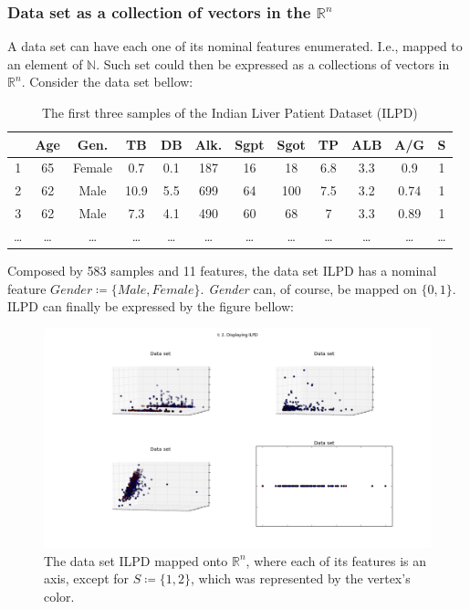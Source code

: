 \documentclass[12pt]{article}
\begin{document}
\subsubsection{Data set as a collection of vectors in the $\mathbb{R}^n$}

A data set can have each one of its nominal features enumerated. I.e., mapped to an element of $\mathbb{N}$. Such set could then be expressed as a collections of vectors in $\mathbb{R}^n$.
Consider the data set bellow:

\begin{table}[H]
	\begin{tabular}{ c | *{11}{|c}| }
		& \textbf{Age}
		& \textbf{Gen.}
		& \textbf{TB}
		& \textbf{DB}
		& \textbf{Alk.}
		& \textbf{Sgpt}
		& \textbf{Sgot}
		& \textbf{TP}
		& \textbf{ALB}
		& \textbf{A/G}
		& \textbf{S} \\
		 & 65 & Female & 0.7 & 0.1 & 187 & 16 & 18 & 6.8 & 3.3 & 0.9 & 1 \\
		2 & 62 & Male & 10.9 & 5.5 & 699 & 64 & 100 & 7.5 & 3.2 & 0.74 & 1 \\
		3 & 62 & Male & 7.3 & 4.1 & 490 & 60 & 68 & 7 & 3.3 & 0.89 & 1\\
		… & … & … & … & … & … & … & … & … & … & … & … \\
	\end{tabular}

	\caption{The first three samples of the Indian Liver Patient Dataset (ILPD)}
\end{table}

Composed by 583 samples and 11 features, the data set ILPD has a nominal feature $Gender \coloneqq \{Male, Female\}$. {\em Gender} can, of course, be mapped on $\{0, 1\}$. ILPD can finally be expressed by the figure bellow:

\begin{figure}[H]
	\centering
	\captionsetup{justification=centering}

	\includegraphics[scale=.3]{displaying_ILPD}
	\caption{The data set ILPD mapped onto $\mathbb{R}^n$, where each of its features is an axis, except for $S \coloneqq \{1, 2\}$, which was represented by the vertex's color.}
	\label{fig:disp_ilpd}
\end{figure}
\end{document}

